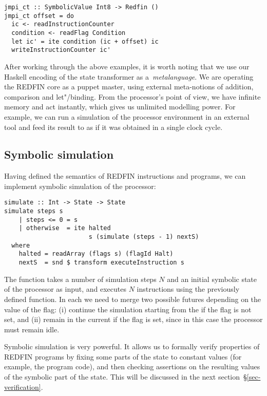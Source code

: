 \begin{verbatim}
jmpi_ct :: SymbolicValue Int8 -> Redfin ()
jmpi_ct offset = do
  ic <- readInstructionCounter
  condition <- readFlag Condition
  let ic' = ite condition (ic + offset) ic
  writeInstructionCounter ic'
\end{verbatim}


\noindent
After working through the above examples, it is worth noting that we use our
Haskell encoding of the state transformer as a~\emph{metalanguage}. We are
operating the REDFIN core as a puppet master, using external
meta-notions of addition,
comparison and let"/binding. From the processor's
point of view, we have infinite memory and act instantly, which gives us unlimited
modelling power. For example, we can run a simulation of the processor environment
in an external tool and feed its result to  as if it was
obtained in a single clock cycle.

\subsection{Symbolic simulation}

Having defined the semantics of REDFIN instructions and programs, we can
implement symbolic simulation of the processor:

\begin{verbatim}
simulate :: Int -> State -> State
simulate steps s
    | steps <= 0 = s
    | otherwise  = ite halted
                       s (simulate (steps - 1) nextS)
  where
    halted = readArray (flags s) (flagId Halt)
    nextS  = snd $ transform executeInstruction s
\end{verbatim}

\noindent
The function takes a number of simulation steps $N$ and an initial symbolic
state of the processor as input, and executes $N$ instructions using the
previously defined  function. In each  we need
to merge two possible futures depending on the value of the  flag:
(i) continue the simulation starting from the  if the flag is not
set, and (ii) remain in the current  if the flag is set, since in
this case the processor must remain idle.

Symbolic simulation is very powerful. It allows us to formally verify properties
of REDFIN programs by fixing some parts of the state to constant values (for
example, the program code), and then checking assertions on the resulting values of
the symbolic part of the state. This will be discussed in the next
section~\S\ref{sec-verification}.

